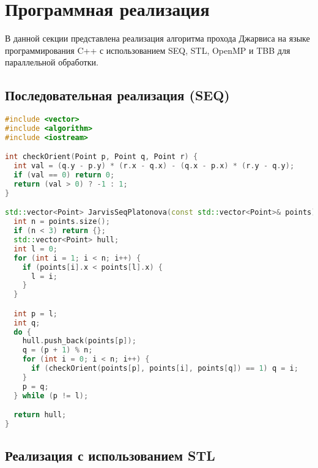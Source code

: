 \documentclass[]{article}
\theoremstyle{remark}
\theoremstyle{definition}
\begin{document}
\newpage

\section{Программная реализация}

\par В данной секции представлена реализация алгоритма прохода Джарвиса на языке программирования C++ с использованием SEQ, STL, OpenMP и TBB для параллельной обработки.

\subsection{Последовательная реализация (SEQ)}

\begin{lstlisting}[language=C++]
#include <vector>
#include <algorithm>
#include <iostream>

int checkOrient(Point p, Point q, Point r) {
  int val = (q.y - p.y) * (r.x - q.x) - (q.x - p.x) * (r.y - q.y);
  if (val == 0) return 0;
  return (val > 0) ? -1 : 1;
}

std::vector<Point> JarvisSeqPlatonova(const std::vector<Point>& points) {
  int n = points.size();
  if (n < 3) return {};
  std::vector<Point> hull;
  int l = 0;
  for (int i = 1; i < n; i++) {
    if (points[i].x < points[l].x) {
      l = i;
    }
  }

  int p = l;
  int q;
  do {
    hull.push_back(points[p]);
    q = (p + 1) % n;
    for (int i = 0; i < n; i++) {
      if (checkOrient(points[p], points[i], points[q]) == 1) q = i;
    }
    p = q;
  } while (p != l);

  return hull;
}

\end{lstlisting}

\subsection{Реализация с использованием STL}
\end{document}
